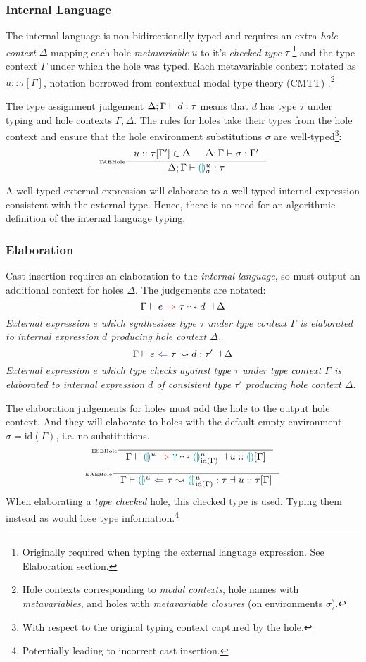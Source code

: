 \subsubsection{Internal Language}\label{sec:HazelInternalLang}
The internal language is non-bidirectionally typed and requires an extra \textit{hole context} $\Delta$ mapping each hole \textit{metavariable} $u$ to it's \textit{checked type} $\tau$ \footnote{Originally required when typing the external language expression. See Elaboration section.} and the type context $\Gamma$ under which the hole was typed. Each metavariable context notated as $u :: \tau[\Gamma]$, notation borrowed from contextual modal type theory (CMTT) \cite{CMTT}.\footnote{Hole contexts corresponding to \textit{modal contexts}, hole names with \textit{metavariables}, and holes with \textit{metavariable closures} (on environments $\sigma$).} 

The type assignment judgement $\Delta;\Gamma \vdash d : \tau$ means that $d$ has type $\tau$ under typing and hole contexts $\Gamma, \Delta$. The rules for holes take their types from the hole context and ensure that the hole environment substitutions $\sigma$ are well-typed\footnote{With respect to the original typing context captured by the hole.}:
\[\inference[\tiny TAEHole]{u :: \tau[\Gamma'] \in \Delta & \typeassignment{\sigma}{\Gamma'}}{\typeassignment{\hole^u_\sigma}{\tau}}\]

A well-typed external expression will elaborate to a well-typed internal expression consistent with the external type. Hence, there is no need for an algorithmic definition of the internal language typing.

\subsubsection{Elaboration}\label{sec:HazelElaboration}
Cast insertion requires an elaboration to the \textit{internal language}, so must output an additional context for holes $\Delta$. The judgements are notated: \[\elaborationSynthesis{e}{\tau}{d}{\Delta}\]
\textit{
External expression $e$ which synthesises type $\tau$ under type context $\Gamma$ is elaborated to internal expression $d$ producing hole context $\Delta$. }
\[\elaborationAnalysis{e}{\tau}{d}{\tau'}{\Delta}\]
\textit{
External expression $e$ which type checks against type $\tau$ under type context $\Gamma$ is elaborated to internal expression $d$ of consistent type $\tau'$ producing hole context $\Delta$.}

The elaboration judgements for holes must add the hole to the output hole context. And they will elaborate to holes with the default empty environment $\sigma = \mathrm{id}(\Gamma)$, i.e. no substitutions.
\[\inference[\tiny ESEHole]{}{\elaborationSynthesis{\hole^u}{\dyn}{\hole^u_{\mathrm{id}(\Gamma)}}{u :: \hole[] [\Gamma]}}\]
\[\inference[\tiny EAEHole]{}{\elaborationAnalysis{\hole^u}{\tau}{\hole^u_{\mathrm{id}(\Gamma)}}{\tau}{u::\tau[\Gamma]}}\]
When elaborating a \textit{type checked} hole, this checked type is used. Typing them instead as {\dyn} would lose type information.\footnote{Potentially leading to incorrect cast insertion.}

